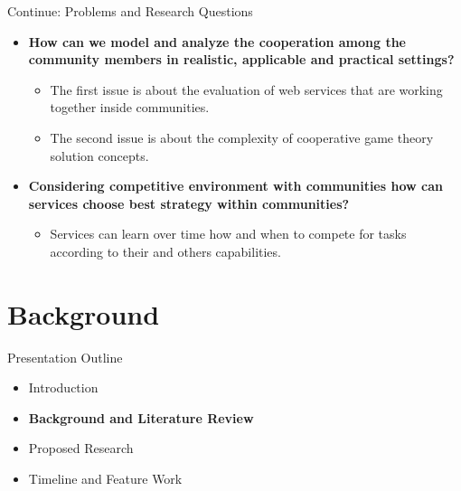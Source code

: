 \documentclass{beamer}
\begin{document}
\begin{frame}{Continue: Problems and Research Questions}
 \begin{itemize}
   \item \textbf{How can we model and analyze the cooperation
        among the community members in realistic, applicable and practical
        settings?}
        \begin{itemize}
            \item The first issue is about the evaluation of web services that are working together inside communities.
            \item The second issue is about the complexity of cooperative game theory solution concepts.
        \end{itemize}

   \item \textbf{Considering competitive environment with communities how can services choose best strategy within communities?}
        \begin{itemize}
            \item Services can learn over time how and when to compete for tasks according to their and others capabilities. 
        \end{itemize}
\end{itemize}
\end{frame}

\section{Background}
\begin{frame}{Presentation Outline}
    \begin{itemize}
     	\itemsep=.5cm
    	\item Introduction
    	\item {\bf Background and Literature Review}
    	\item Proposed Research
    	\item Timeline and Feature Work
    \end{itemize}
\end{frame}
\end{document}
